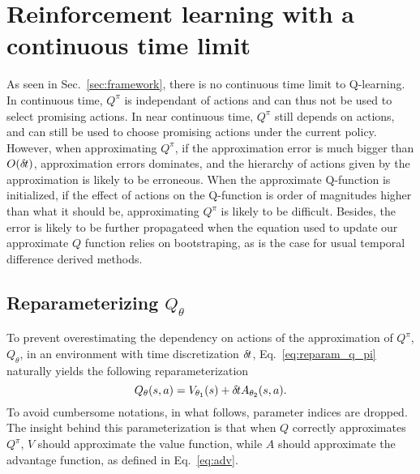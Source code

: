 \section{Reinforcement learning with a continuous time limit}
As seen in Sec.~\ref{sec:framework}, there is no continuous time limit to
Q-learning. In continuous time, $Q^\pi$ is independant of actions and can thus
not be used to select promising actions.  In near continuous time, $Q^\pi$
still depends on actions, and can still be used to choose promising actions
under the current policy. However, when approximating $Q^\pi$, if the
approximation error is much bigger than $O({\delta\hspace{-.1em}t})$, approximation errors
dominates, and the hierarchy of actions given by the approximation is likely to
be erroneous.
When the approximate Q-function is initialized, if the effect of actions on the
Q-function is order of magnitudes higher than what it should be, approximating
$Q^\pi$ is likely to be difficult. Besides, the error is likely to be further
propagateed when the equation used to update our approximate $Q$ function
relies on bootstraping, as is the case for usual temporal difference derived methods.

\subsection{Reparameterizing $Q_\theta$}
\label{subsec:reparam}
To prevent overestimating the dependency on actions of the approximation of
$Q^\pi$, $Q_\theta$, in an environment with time discretization ${\delta\hspace{-.1em}t}$,
Eq.~\eqref{eq:reparam_q_pi} naturally yields the following reparameterization
\begin{equation}
	Q_\theta(s, a) = V_{\theta_1}(s) + {\delta\hspace{-.1em}t} A_{\theta_2}(s, a).
\end{equation}
To avoid cumbersome notations, in what follows, parameter indices are dropped.
The insight behind this parameterization is that when $Q$ correctly
approximates $Q^\pi$, $V$ should approximate the value function, while $A$
should approximate the advantage function, as defined in Eq.~\eqref{eq:adv}.



